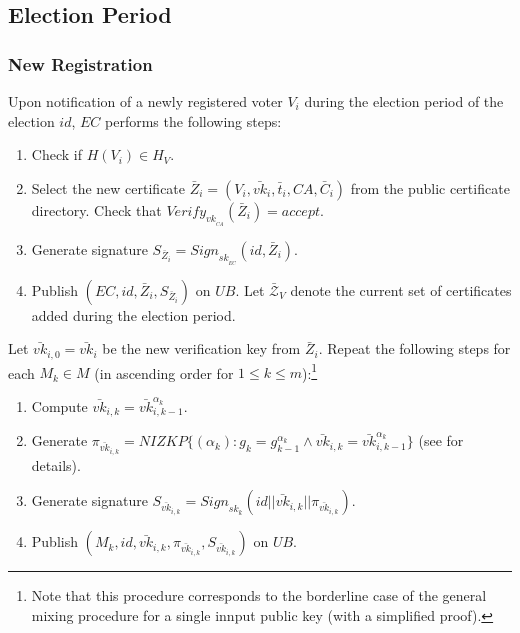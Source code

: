 \documentclass[bibtotoc,halfparskip,oneside]{scrreprt}
\newcommand{\eid}{\mathit{id}\xspace}
\newcommand{\sk}[1]{\mathit{sk}_{#1}\xspace}
\newcommand{\vk}[1]{\mathit{vk}_{#1}\xspace}
\newcommand{\vkbar}[1]{\bar{\mathit{vk}}_{#1}\xspace}
\newcommand{\SK}[1]{\sk{_#1}\xspace}
\newcommand{\VK}[1]{\vk{_#1}\xspace}
\newcommand{\CA}{\ensuremath{\mathit{CA}}\xspace}
\newcommand{\EC}{\ensuremath{\mathit{EC}}\xspace}
\newcommand{\UB}{\ensuremath{\mathit{UB}}\xspace}
\newcommand{\Mixer}[1]{\ensuremath{\mathit{M}_{#1}}\xspace}
\newcommand{\Voter}[1]{\ensuremath{\mathit{V}_{#1}}\xspace}
\begin{document}
\subsection{Election Period}

\subsubsection{New Registration} \label{newregistation}

Upon notification of a newly registered voter $\Voter{i}$ during the election period of the election $\eid$, \EC performs the following steps:
\begin{enumerate}
	\item Check if $H(\Voter{i})\in H_V$.
	\item Select the new certificate $\bar{Z}_i=(\Voter{i},\vkbar{i},\bar{t}_i,\CA,\bar{C}_i)$ from the public certificate directory. Check that $\mathit{Verify}_{\VK{\CA}}(\bar{Z}_i)=\mathit{accept}$.
	\item Generate signature $S_{\bar{Z}_i}=\mathit{Sign}_{\SK{\EC}}(\eid,\bar{Z}_i)$.
	\item Publish $(\EC,\eid,\bar{Z}_i,S_{\bar{Z}_i})$ on \UB. Let $\bar{\mathcal{Z}}_V$ denote the current set of certificates added during the election period.
\end{enumerate}

Let $\vkbar{i,0}=\vkbar{i}$ be the new verification key from $\bar{Z}_i$. Repeat the following steps for each $\Mixer{k}\in M$ (in ascending order for $1\leq k\leq m$):\footnote{Note that this procedure corresponds to the borderline case of the general mixing procedure for a single innput public key (with a simplified proof).}
\begin{enumerate}[resume]
	\item Compute $\vkbar{i,k}=\vkbar{i,k-1}^{\alpha_k}$.
\	\item Generate $\pi_{\vkbar{i,k}}=\mathit{NIZKP}\{(\alpha_k):g_k=g_{k-1}^{\alpha_k}\wedge\vkbar{i,k}=\vkbar{i,k-1}^{\alpha_k}\}$ (see  for details).
	\item Generate signature $S_{\vkbar{i,k}}=\mathit{Sign}_{\sk{k}}(\eid||\vkbar{i,k}||\pi_{\vkbar{i,k}})$.
	\item Publish $(\Mixer{k},\eid,\vkbar{i,k},\pi_{\vkbar{i,k}},S_{\vkbar{i,k}})$ on \UB.
\end{enumerate}
\end{document}
